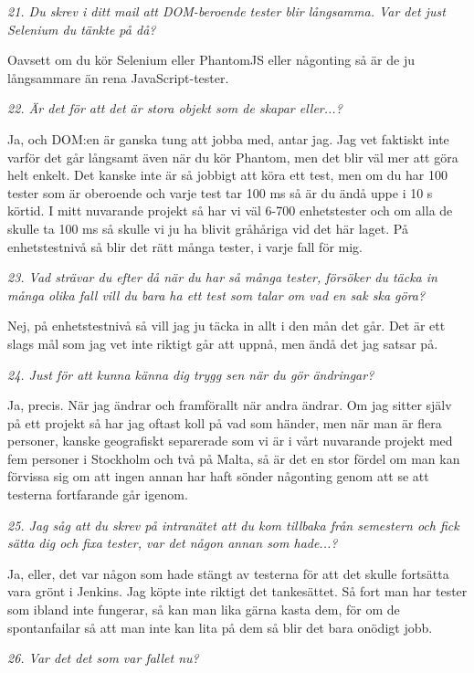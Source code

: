 \documentclass[11pt]{article}
\begin{document}
\emph{21. Du skrev i ditt mail att DOM-beroende tester blir långsamma. Var det just Selenium du tänkte på då?}

Oavsett om du kör Selenium eller PhantomJS eller någonting så är de ju långsammare än rena JavaScript-tester.

\emph{22. Är det för att det är stora objekt som de skapar eller...?}

Ja, och DOM:en är ganska tung att jobba med, antar jag. Jag vet faktiskt inte varför det går långsamt även när du kör Phantom, men det blir väl mer att göra helt enkelt. Det kanske inte är så jobbigt att köra ett test, men om du har 100 tester som är oberoende och varje test tar 100 ms så är du ändå uppe i 10 s körtid. I mitt nuvarande projekt så har vi väl 6-700 enhetstester och om alla de skulle ta 100 ms så skulle vi ju ha blivit gråhåriga vid det här laget. På enhetstestnivå så blir det rätt många tester, i varje fall för mig.

\emph{23. Vad strävar du efter då när du har så många tester, försöker du täcka in många olika fall vill du bara ha ett test som talar om vad en sak ska göra?}

Nej, på enhetstestnivå så vill jag ju täcka in allt i den mån det går. Det är ett slags mål som jag vet inte riktigt går att uppnå, men ändå det jag satsar på.

\emph{24. Just för att kunna känna dig trygg sen när du gör ändringar?}

Ja, precis. När jag ändrar och framförallt när andra ändrar. Om jag sitter själv på ett projekt så har jag oftast koll på vad som händer, men när man är flera personer, kanske geografiskt separerade som vi är i vårt nuvarande projekt med fem personer i Stockholm och två på Malta, så är det en stor fördel om man kan förvissa sig om att ingen annan har haft sönder någonting genom att se att testerna fortfarande går igenom.

\emph{25. Jag såg att du skrev på intranätet att du kom tillbaka från semestern och fick sätta dig och fixa tester, var det någon annan som hade...?}

Ja, eller, det var någon som hade stängt av testerna för att det skulle fortsätta vara grönt i Jenkins. Jag köpte inte riktigt det tankesättet. Så fort man har tester som ibland inte fungerar, så kan man lika gärna kasta dem, för om de spontanfailar så att man inte kan lita på dem så blir det bara onödigt jobb.

\emph{26. Var det det som var fallet nu?}
\end{document}
